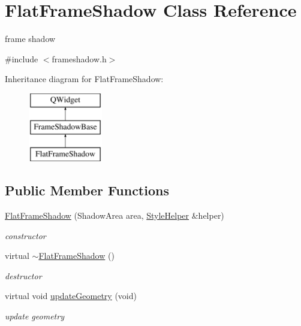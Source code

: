 \hypertarget{class_flat_frame_shadow}{}\section{Flat\+Frame\+Shadow Class Reference}
\label{class_flat_frame_shadow}


frame shadow  




{\ttfamily \#include $<$frameshadow.\+h$>$}

Inheritance diagram for Flat\+Frame\+Shadow\+:\begin{figure}[H]
\begin{center}
\leavevmode
\includegraphics[height=3.000000cm]{class_flat_frame_shadow}
\end{center}
\end{figure}
\subsection*{Public Member Functions}
\begin{DoxyCompactItemize}
\item 
\mbox{\label{class_flat_frame_shadow_aae2a32f514fc6afd8ccc004fe7c6b065}} 
\hyperlink{class_flat_frame_shadow_aae2a32f514fc6afd8ccc004fe7c6b065}{Flat\+Frame\+Shadow} (Shadow\+Area area, \hyperlink{class_style_helper}{Style\+Helper} \&helper)
\begin{DoxyCompactList}\small\item\em constructor \end{DoxyCompactList}\item 
\mbox{\label{class_flat_frame_shadow_a1eaaefa261b53aeba6d7e60171e9d633}} 
virtual \hyperlink{class_flat_frame_shadow_a1eaaefa261b53aeba6d7e60171e9d633}{$\sim$\+Flat\+Frame\+Shadow} ()
\begin{DoxyCompactList}\small\item\em destructor \end{DoxyCompactList}\item 
\mbox{\label{class_flat_frame_shadow_ab50d3f7c00f572aa0609cb1f45c49ba3}} 
virtual void \hyperlink{class_flat_frame_shadow_ab50d3f7c00f572aa0609cb1f45c49ba3}{update\+Geometry} (void)
\begin{DoxyCompactList}\small\item\em update geometry \end{DoxyCompactList}\end{DoxyCompactItemize}
